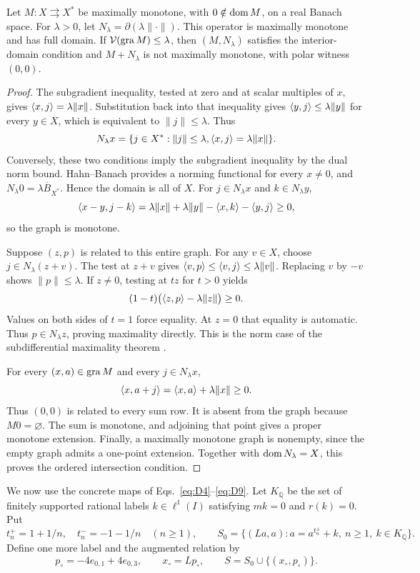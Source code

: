 \begin{lemma}\label{lem:norm-partner}
Let $M:X\rightrightarrows X^*$ be maximally monotone, with
$0\notin\operatorname{dom} M$, on a real Banach space. For $\lambda>0$, let
$N_\lambda=\partial(\lambda\|\cdot\|)$. This operator is maximally
monotone and has full domain. If $\mathcal V(\operatorname{gra} M)\le\lambda$, then
$(M,N_\lambda)$ satisfies the interior-domain condition and
$M+N_\lambda$ is not maximally monotone, with polar witness $(0,0)$.
\end{lemma}
\begin{proof}
The subgradient inequality, tested at zero and at scalar multiples of
$x$, gives $\langle x,j\rangle=\lambda\|x\|$. Substitution back into that
inequality gives $\langle y,j\rangle\le\lambda\|y\|$ for every $y\in X$,
which is equivalent to $\|j\|\le\lambda$. Thus
\[
N_\lambda x=\{j\in X^*: \|j\|\le\lambda,
                  \langle x,j\rangle=\lambda\|x\|\}.
\]
Conversely, these two conditions imply the subgradient inequality by the
dual norm bound. Hahn--Banach provides a norming functional for every
$x\ne0$, and $N_\lambda0=\lambda\overline B_{X^*}$. Hence the domain is
all of $X$. For $j\in N_\lambda x$ and $k\in N_\lambda y$,
\[
\langle x-y,j-k\rangle
=\lambda\|x\|+\lambda\|y\|-\langle x,k\rangle-\langle y,j\rangle\ge0,
\]
so the graph is monotone.

Suppose $(z,p)$ is related to this entire graph. For any $v\in X$,
choose $j\in N_\lambda(z+v)$. The test at $z+v$ gives
$\langle v,p\rangle\le\langle v,j\rangle\le\lambda\|v\|$. Replacing $v$ by $-v$
shows $\|p\|\le\lambda$. If $z\ne0$, testing at $tz$ for $t>0$ yields
\[
(1-t)\bigl(\langle z,p\rangle-\lambda\|z\|\bigr)\ge0.
\]
Values on both sides of $t=1$ force equality. At $z=0$ that equality is
automatic. Thus $p\in N_\lambda z$, proving maximality directly.
This is the norm case of the subdifferential maximality theorem
\cite{rockafellar1970subdiff}.

For every $(x,a)\in\operatorname{gra} M$ and every $j\in N_\lambda x$,
\[
\langle x,a+j\rangle=\langle x,a\rangle+\lambda\|x\|\ge0.
\]
Thus $(0,0)$ is related to every sum row. It is absent from the graph
because $M0=\varnothing$. The sum is monotone, and adjoining that point
gives a proper monotone extension. Finally, a maximally monotone graph is
nonempty, since the empty graph admits a one-point extension. Together
with $\operatorname{dom} N_\lambda=X$, this proves the ordered intersection condition.
\end{proof}

We now use the concrete maps of Eqs.~\eqref{eq:D4}--\eqref{eq:D9}.
Let $K_{\mathbb Q}$ be the set of finitely supported rational labels
$k\in\ell^1(I)$ satisfying $mk=0$ and $r(k)=0$. Put
\[
t_n^+=1+1/n,\quad t_n^-=-1-1/n\quad(n\ge1),\qquad
S_0=\{(La,a):a=a^{t_n^\pm}+k,\ n\ge1,\ k\in K_{\mathbb Q}\}.
\]
Define one more label and the augmented relation by
\begin{equation}
p_\circ=-4e_{0,1}+4e_{0,3},\qquad x_\circ=Lp_\circ,
\qquad S=S_0\cup\{(x_\circ,p_\circ)\}.
\label{eq:nonconstructive-seed}
\end{equation}

